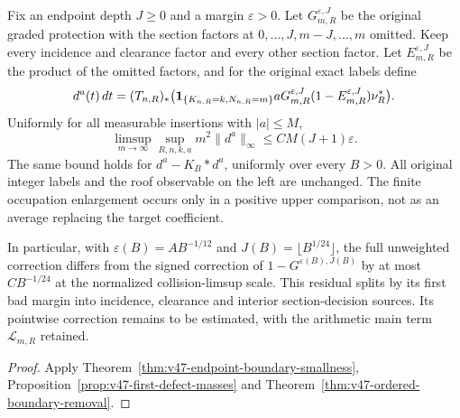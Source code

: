 \begin{leadtheorem}
\label{thm:intro-v47-boundary-decisions}
Fix an endpoint depth $J\ge0$ and a margin $\varepsilon>0$. Let
$G^{\varepsilon,J}_{m,R}$ be the original graded protection with the
section factors at $0,\ldots,J,m-J,\ldots,m$ omitted. Keep every
incidence and clearance factor and every other section factor. Let
$E^{\varepsilon,J}_{m,R}$ be the product of the omitted factors, and
for the original exact labels define
\[
 d^a(t)\,dt=(T_{n,R})_*
 \bigl(\mathbf1_{\{K_{n,R}=k,N_{n,R}=m\}}
       aG^{\varepsilon,J}_{m,R}(1-E^{\varepsilon,J}_{m,R})\nu_R^*\bigr).
\]
Uniformly for all measurable insertions with $|a|\le M$,
\[
 \limsup_{m\to\infty}\sup_{R,n,k,a}m^2\|d^a\|_\infty
       \le CM(J+1)\varepsilon.
\]
The same bound holds for $d^a-K_B*d^a$, uniformly over every $B>0$.
All original integer labels and the roof observable on the left are
unchanged. The finite occupation enlargement occurs only in a positive
upper comparison, not as an average replacing the target coefficient.

In particular, with $\varepsilon(B)=AB^{-1/12}$ and
$J(B)=\lfloor B^{1/24}\rfloor$, the full unweighted correction differs
from the signed correction of $1-G^{\varepsilon(B),J(B)}$ by at most
$CB^{-1/24}$ at the normalized collision-limsup scale. This residual
splits by its first bad margin into incidence, clearance and interior
section-decision sources. Its pointwise correction remains to be
estimated, with the arithmetic main term $\mathcal L_{m,R}$ retained.
\end{leadtheorem}
\begin{proof}
Apply Theorem~\ref{thm:v47-endpoint-boundary-smallness},
Proposition~\ref{prop:v47-first-defect-masses} and
Theorem~\ref{thm:v47-ordered-boundary-removal}.
\end{proof}

